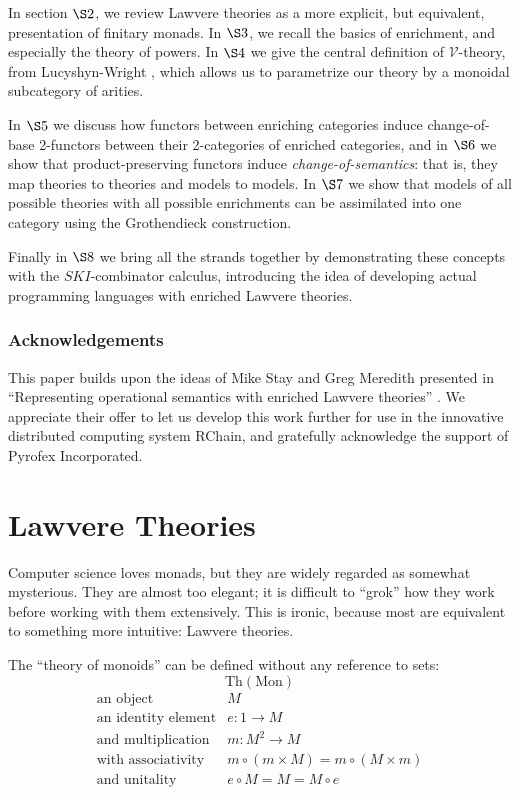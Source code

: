 \documentclass{amsart}
\theoremstyle{definition}
\newcommand{\Th}{\mathrm{Th}}
\newcommand{\Mon}{\mathrm{Mon}}
\newcommand{\V}{\mathscr{V}}
\newcommand{\maps}{\colon}
\begin{document}
In section $\S2$, we review Lawvere theories as a more explicit, but equivalent, presentation of finitary monads. In $\S3$, we recall the basics of enrichment, and especially the theory of powers.  In $\S4$ we give the central definition of $\V$-theory, from Lucyshyn-Wright \cite{rbb}, which allows us to parametrize our theory by a monoidal subcategory of arities.

In $\S5$ we discuss how functors between enriching categories induce change-of-base 2-functors between their 2-categories of enriched categories, and in $\S6$ we show that product-preserving functors induce \textit{change-of-semantics}: that is, they map theories to theories and models to models.  In $\S7$ we show that models of all possible theories with all possible enrichments can be assimilated into one category using the Grothendieck construction.

Finally in $\S8$ we bring all the strands together by demonstrating these concepts with the $SKI$-combinator calculus, introducing the idea of developing actual programming languages with enriched Lawvere theories.

\subsubsection*{Acknowledgements}

This paper builds upon the ideas of Mike Stay and Greg Meredith presented in ``Representing operational semantics with enriched Lawvere theories''  \cite{roswelt}.  We appreciate their offer to let us develop this work further for use in the innovative distributed computing system RChain, and gratefully acknowledge the support of Pyrofex Incorporated. \newpage

\section{Lawvere Theories}
Computer science loves monads, but they are widely regarded as somewhat mysterious. They are almost too elegant; it is difficult to ``grok'' how they work before working with them extensively. This is ironic, because most are equivalent to something more intuitive: Lawvere theories.

The ``theory of monoids'' can be defined without any reference to sets: $$\Th(\Mon)$$
\[\begin{array}{rl}
\text{an object} & M\\
\text{an identity element} & e\maps1 \to M\\
\text{and multiplication} & m\maps M^2 \to M\\
\text{with associativity} & m \circ (m \times M) = m \circ (M \times m)\\
\text{and unitality} & e \circ M = M = M \circ e\\
\end{array}\]
\end{document}
